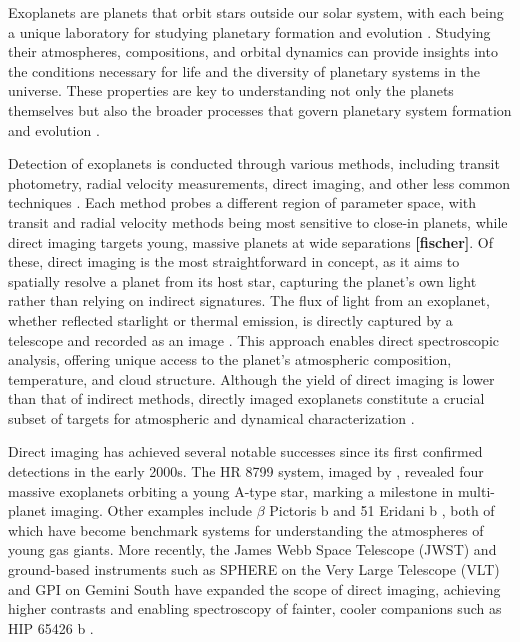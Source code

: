 \documentclass[preprint,longauthor]{aastex631}
\numberwithin{equation}{section}
\begin{document}
Exoplanets are planets that orbit stars outside our solar system, with each being a unique laboratory for studying planetary formation and evolution \citep{kaushikExoplanetDetectionDetailed2025}. Studying their atmospheres, compositions, and orbital dynamics can provide insights into the conditions necessary for life and the diversity of planetary systems in the universe. These properties are key to understanding not only the planets themselves but also the broader processes that govern planetary system formation and evolution \citep{madhusudhanExoplanetaryAtmospheresKey2019}.

Detection of exoplanets is conducted through various methods, including transit photometry, radial velocity measurements, direct imaging, and other less common techniques \citep{weiSurveyExoplanetaryDetection2018}. Each method probes a different region of parameter space, with transit and radial velocity methods being most sensitive to close-in planets, while direct imaging targets young, massive planets at wide separations \textbf{[fischer]}. Of these, direct imaging is the most straightforward in concept, as it aims to spatially resolve a planet from its host star, capturing the planet’s own light rather than relying on indirect signatures. The flux of light from an exoplanet, whether reflected starlight or thermal emission, is directly captured by a telescope and recorded as an image \citep{kaushikExoplanetDetectionDetailed2025}. This approach enables direct spectroscopic analysis, offering unique access to the planet’s atmospheric composition, temperature, and cloud structure. Although the yield of direct imaging is lower than that of indirect methods, directly imaged exoplanets constitute a crucial subset of targets for atmospheric and dynamical characterization \citep{currieDirectImagingSpectroscopy2023}.

Direct imaging has achieved several notable successes since its first confirmed detections in the early 2000s. The HR 8799 system, imaged by \citet{maroisDirectImagingMultiple2008}, revealed four massive exoplanets orbiting a young A-type star, marking a milestone in multi-planet imaging. Other examples include $\beta$ Pictoris b \citep{lagrangeGiantPlanetImaged2010} and 51 Eridani b \citep{macintoshDiscoverySpectroscopyYoung2015}, both of which have become benchmark systems for understanding the atmospheres of young gas giants. More recently, the James Webb Space Telescope (JWST) and ground-based instruments such as SPHERE on the Very Large Telescope (VLT) and GPI on Gemini South have expanded the scope of direct imaging, achieving higher contrasts and enabling spectroscopy of fainter, cooler companions such as HIP 65426 b \citep{carterJWSTEarlyRelease2023}.
\end{document}
